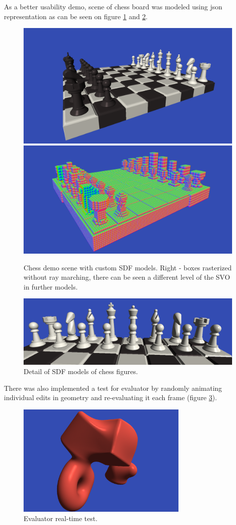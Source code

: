 \documentclass[11pt, a4paper]{article}
\begin{document}
As a better usability demo, scene of chess board was modeled using json representation as can be seen on figure \ref{chess} and \ref{chess2}.
\begin{figure}[ht]
    \centering
    \includegraphics[width=.45\textwidth]{chess.png}
    \includegraphics[width=.45\textwidth]{chessBoxes.png}
    \caption{Chess demo scene with custom SDF models. Right - boxes rasterized without ray marching, there can be seen a different level of the SVO in further models.}
    \label{chess}
\end{figure}
\begin{figure}[ht]
    \centering
    \includegraphics[width=\textwidth]{chess2.png}
    \caption{Detail of SDF models of chess figures.}
    \label{chess2}
\end{figure}

There was also implemented a test for evaluator by randomly animating individual edits in geometry and re-evaluating it each frame (figure \ref{floating}).
\begin{figure}[ht]
    \centering
    \includegraphics[height=5.5cm]{floating.png}
    \caption{Evaluator real-time test.}
    \label{floating}
\end{figure}
\end{document}
